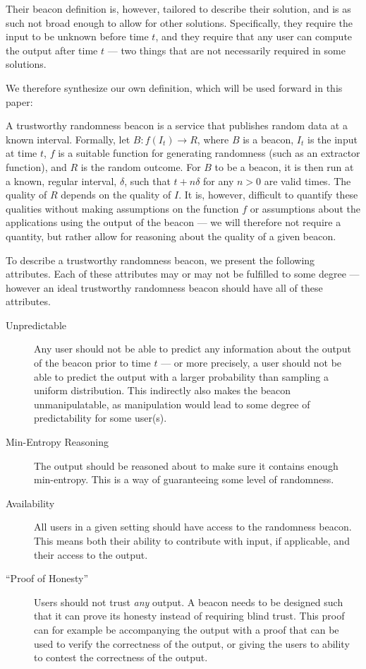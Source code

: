 Their beacon definition is, however, tailored to describe their solution, and is as such not broad enough to allow for other solutions.
Specifically, they require the input to be unknown before time $t$, and they require that any user can compute the output after time $t$ --- two things that are not necessarily required in some solutions.

We therefore synthesize our own definition, which will be used forward in this paper:

A trustworthy randomness beacon is a service that publishes random data at a known interval.
Formally, let $B: f(I_t) \rightarrow R$, where $B$ is a beacon, $I_t$ is the input at time $t$, $f$ is a suitable function for generating randomness (such as an extractor function), and $R$ is the random outcome.
For $B$ to be a beacon, it is then run at a known, regular interval, $\delta$, such that $t+n\delta$ for any $n>0$ are valid times.
The quality of $R$ depends on the quality of $I$. It is, however, difficult to quantify these qualities without making assumptions on the function $f$ or assumptions about the applications using the output of the beacon --- we will therefore not require a quantity, but rather allow for reasoning about the quality of a given beacon.


To describe a trustworthy randomness beacon, we present the following attributes. Each of these attributes may or may not be fulfilled to some degree --- however an ideal trustworthy randomness beacon should have all of these attributes.

\begin{description}
    \item[Unpredictable] Any user should not be able to predict any information about the output of the beacon prior to time $t$ --- or more precisely, a user should not be able to predict the output with a larger probability than sampling a uniform distribution. This indirectly also makes the beacon unmanipulatable, as manipulation would lead to some degree of predictability for some user(s).
    \item[Min-Entropy Reasoning] The output should be reasoned about to make sure it contains enough min-entropy. This is a way of guaranteeing some level of randomness.
    \item[Availability] All users in a given setting should have access to the randomness beacon.
    This means both their ability to contribute with input, if applicable, and their access to the output.
    \item[``Proof of Honesty''] Users should not trust \emph{any} output. A beacon needs to be designed such that it can prove its honesty instead of requiring blind trust. This proof can for example be accompanying the output with a proof that can be used to verify the correctness of the output, or giving the users to ability to contest the correctness of the output.
\end{description}

